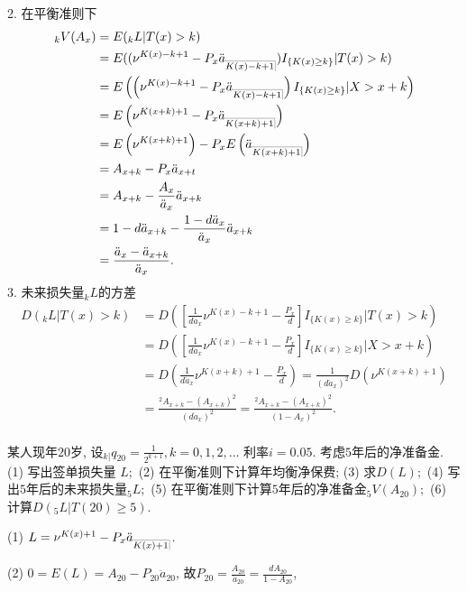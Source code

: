 \documentclass[a4paper,openany, 10pt]{ctexbook}
\makeatletter
\def\z{\left}
\def\y{\right}
\DeclareRobustCommand{\annu}[1]{_{%
    \def\arraystretch{0}%
    \setlength\arraycolsep{1pt}%
    \setlength\arrayrulewidth{.2pt}%
    \begin{array}[b]{@{}c|}\hline
        \\[\arraycolsep]%
        \scriptstyle #1%
    \end{array}%
}}
\makeatother
\begin{document}
2. 在平衡准则下
\begin{align*}
    {}_kV(A_x)&=E({}_kL|T(x)>k) \\
                        &=E((\nu^{K(x)-k+1}-P_x \ddot a_{\annu {K(x)-k+1}})I_{\{K(x)\ge k\}}|T(x)>k)\\
                        &=E\z(\z(\nu^{K(x)-k+1}-P_x \ddot a_{\annu {K(x)-k+1}}\y)I_{\{K(x)\ge k\}}|X>x+k\y)\\
                        &=E\z(\nu^{K(x+k)+1}-P_x \ddot a_{\annu {K(x+k)+1}}\y)\\
                        &=E\z(\nu^{K(x+k)+1}\y)-P_x E\z(\ddot a_{\annu {K(x+k)+1}}\y)\\
                        &= A_{x+k}-P_x\ddot a_{x+t}\\
                        &= A_{x+k}-\frac{ A_x}{\ddot a_x}\ddot a_{x+k}\\
                        &=1-d\ddot a_{x+k}-\frac{1-d \ddot a_x}{\ddot a_x}\ddot a_{x+k}\\
                        &=\frac{\ddot a_x-\ddot a_{x+k}}{\ddot a_x}.
\end{align*}
3. 未来损失量$_kL$的方差
\begin{align*}
    D(_kL|T(x)>k) &=D\z(\z[\frac{1}{d\ddot a_x}\nu^{K(x)-k+1}-\frac{P_x }{d}\y]I_{\{K(x)\ge k\}}|T(x)>k\y)\\
                        &=D\z(\z[\frac{1}{d\ddot a_x}\nu^{K(x)-k+1}-\frac{P_x }{d}\y]I_{\{K(x)\ge k\}}|X>x+k\y)\\
                        &=D\z(\frac{1}{d\ddot a_x}\nu^{K(x+k)+1}-\frac{P_x }{d}\y)
                        =\frac{1}{(d\ddot a_x)^2}D(\nu^{K(x+k)+1})\\
                        &=\frac{{}^2 A_{x+k}-( A_{x+k})^2}{(d\ddot a_x)^2}=\frac{{}^2 A_{x+k}-( A_{x+k})^2}{(1-A_x)^2}.\\ 
\end{align*}

\begin{example}
    某人现年$20$岁, 设${}_{k|}q_{20}=\frac{1}{2^{k+1}},k=0,1,2,...$ 利率$i=0.05.$ 考虑$5$年后的净准备金. (1) 写出签单损失量 $L;$ (2) 在平衡准则下计算年均衡净保费; (3) 求$D(L);$ (4) 写出$5$年后的未来损失量$_{5}L;$ (5) 在平衡准则下计算$5$年后的净准备金${}_{5}V( A_{20});$ (6) 计算$D({}_{5}L|T(20)\geq 5).$
\end{example}
\solution
(1) $L = \nu^{K(x)+1} - P_x\ddot{a}_{\annu{K(x)+1}}$. 

(2) $0=E(L)=A_{20}-P_{20}\ddot{a}_{20}$, 故$P_{20}=\frac{A_{20}}{\ddot{a}_{20}} = \frac{dA_{20}}{1-A_{20}}$, 
\end{document}
